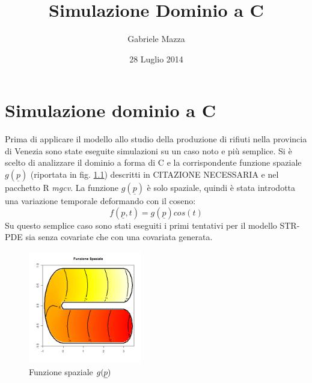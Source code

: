 \documentclass[a4paper,11pt,twoside,openright]{book}							%
\date{28 Luglio 2014}
\author{Gabriele Mazza}
\title{Simulazione Dominio a C}
\begin{document}
\listoffigures
\listoftables

\chapter{Simulazione dominio a C}

Prima di applicare il modello allo studio della produzione di rifiuti nella provincia di Venezia sono state eseguite simulazioni su un caso noto e più semplice. Si è scelto di analizzare il dominio a forma di C e la corrispondente funzione spaziale $g(\underline p)$ (riportata in fig. \ref{fig:domC_fstest}) descritti in CITAZIONE NECESSARIA e nel pacchetto R \textit{mgcv}. La funzione $g(\underline p)$ è solo spaziale, quindi è stata introdotta una variazione temporale deformando con il coseno:
$$
f(\underline p, t)=g(\underline p)cos(t)
$$
Su questo semplice caso sono stati eseguiti i primi tentativi per il modello STR-PDE sia senza covariate che con una covariata generata.
\begin{figure}[h]
	\centering
	\includegraphics[width=0.44\textwidth]{Immagini/DomCinizio/DomC_fstest.png}   
	\caption{Funzione spaziale $g(\protect\underline{p})$}
	\label{fig:domC_fstest}
\end{figure}
\end{document}
